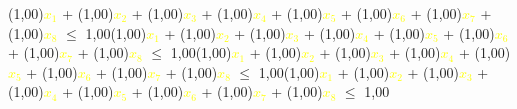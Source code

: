 \documentclass{beamer}
\newcommand\tab[1][1cm]{\hspace*{#1}}
\begin{document}
\begin{frame}
\tab (1,00)\textcolor{yellow}{$x_{1}$} + (1,00)\textcolor{yellow}{$x_{2}$} + (1,00)\textcolor{yellow}{$x_{3}$} + (1,00)\textcolor{yellow}{$x_{4}$} + (1,00)\textcolor{yellow}{$x_{5}$} + (1,00)\textcolor{yellow}{$x_{6}$} + (1,00)\textcolor{yellow}{$x_{7}$} + (1,00)\textcolor{yellow}{$x_{8}$} $\leq$ 1,00\newline\newline\tab (1,00)\textcolor{yellow}{$x_{1}$} + (1,00)\textcolor{yellow}{$x_{2}$} + (1,00)\textcolor{yellow}{$x_{3}$} + (1,00)\textcolor{yellow}{$x_{4}$} + (1,00)\textcolor{yellow}{$x_{5}$} + (1,00)\textcolor{yellow}{$x_{6}$} + (1,00)\textcolor{yellow}{$x_{7}$} + (1,00)\textcolor{yellow}{$x_{8}$} $\leq$ 1,00\newline\newline\tab (1,00)\textcolor{yellow}{$x_{1}$} + (1,00)\textcolor{yellow}{$x_{2}$} + (1,00)\textcolor{yellow}{$x_{3}$} + (1,00)\textcolor{yellow}{$x_{4}$} + (1,00)\textcolor{yellow}{$x_{5}$} + (1,00)\textcolor{yellow}{$x_{6}$} + (1,00)\textcolor{yellow}{$x_{7}$} + (1,00)\textcolor{yellow}{$x_{8}$} $\leq$ 1,00\newline\newline\tab (1,00)\textcolor{yellow}{$x_{1}$} + (1,00)\textcolor{yellow}{$x_{2}$} + (1,00)\textcolor{yellow}{$x_{3}$} + (1,00)\textcolor{yellow}{$x_{4}$} + (1,00)\textcolor{yellow}{$x_{5}$} + (1,00)\textcolor{yellow}{$x_{6}$} + (1,00)\textcolor{yellow}{$x_{7}$} + (1,00)\textcolor{yellow}{$x_{8}$} $\leq$ 1,00\newline\newline\end{frame}
\end{document}
